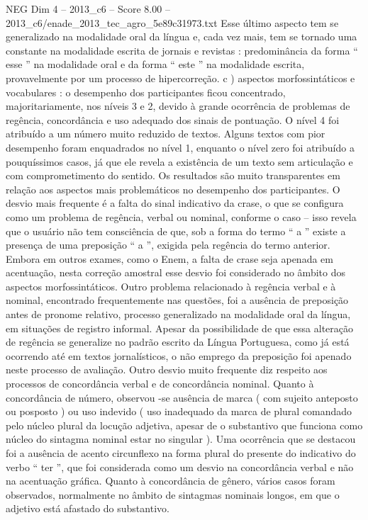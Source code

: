 \begin{textsample}{NEG Dim 4 – 2013\_c6 – Score 8.00 – 2013\_c6/enade\_2013\_tec\_agro\_5e89c31973.txt}
Esse último aspecto tem se generalizado na modalidade oral da língua e, cada vez mais, tem se tornado uma constante na modalidade escrita de jornais e revistas : predominância da forma “ esse ” na modalidade oral e da forma “ este ” na modalidade escrita, provavelmente por um processo de hipercorreção. c ) aspectos morfossintáticos e vocabulares : o desempenho dos participantes ficou concentrado, majoritariamente, nos níveis 3 e 2, devido à grande ocorrência de problemas de regência, concordância e uso adequado dos sinais de pontuação.
O nível 4 foi atribuído a um número muito reduzido de textos.
Alguns textos com pior desempenho foram enquadrados no nível 1, enquanto o nível zero foi atribuído a pouquíssimos casos, já que ele revela a existência de um texto sem articulação e com comprometimento do sentido.
Os resultados são muito transparentes em relação aos aspectos mais problemáticos no desempenho dos participantes.
O desvio mais frequente é a falta do sinal indicativo da crase, o que se configura como um problema de regência, verbal ou nominal, conforme o caso – isso revela que o usuário não tem consciência de que, sob a forma do termo “ a ” existe a presença de uma preposição “ a ”, exigida pela regência do termo anterior.
Embora em outros exames, como o Enem, a falta de crase seja apenada em acentuação, nesta correção amostral esse desvio foi considerado no âmbito dos aspectos morfossintáticos.
Outro problema relacionado à regência verbal e à nominal, encontrado frequentemente nas questões, foi a ausência de preposição antes de pronome relativo, processo generalizado na modalidade oral da língua, em situações de registro informal.
Apesar da possibilidade de que essa alteração de regência se generalize no padrão escrito da Língua Portuguesa, como já está ocorrendo até em textos jornalísticos, o não emprego da preposição foi apenado neste processo de avaliação.
Outro desvio muito frequente diz respeito aos processos de concordância verbal e de concordância nominal.
Quanto à concordância de número, observou -se ausência de marca ( com sujeito anteposto ou posposto ) ou uso indevido ( uso inadequado da marca de plural comandado pelo núcleo plural da locução adjetiva, apesar de o substantivo que funciona como núcleo do sintagma nominal estar no singular ).
Uma ocorrência que se destacou foi a ausência de acento circunflexo na forma plural do presente do indicativo do verbo “ ter ”, que foi considerada como um desvio na concordância verbal e não na acentuação gráfica.
Quanto à concordância de gênero, vários casos foram observados, normalmente no âmbito de sintagmas nominais longos, em que o adjetivo está afastado do substantivo.

\end{textsample}
